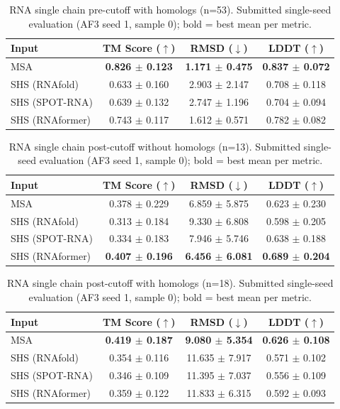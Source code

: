\begin{table}[htbp]
\centering
\caption{RNA single chain pre-cutoff with homologs (n=53). Submitted single-seed evaluation (AF3 seed 1, sample 0); bold = best mean per metric.}
\label{tab:rna_single_chain_pre_cutoff_with_homologs}
\begin{tabular}{lccc}
\toprule
Input & TM Score ($\uparrow$) & RMSD ($\downarrow$) & LDDT ($\uparrow$) \\
\midrule
MSA & \textbf{0.826 $\pm$ 0.123} & \textbf{1.171 $\pm$ 0.475} & \textbf{0.837 $\pm$ 0.072} \\
SHS (RNAfold) & 0.633 $\pm$ 0.160 & 2.903 $\pm$ 2.147 & 0.708 $\pm$ 0.118 \\
SHS (SPOT-RNA) & 0.639 $\pm$ 0.132 & 2.747 $\pm$ 1.196 & 0.704 $\pm$ 0.094 \\
SHS (RNAformer) & 0.743 $\pm$ 0.117 & 1.612 $\pm$ 0.571 & 0.782 $\pm$ 0.082 \\
\bottomrule
\end{tabular}
\end{table}

\begin{table}[htbp]
\centering
\caption{RNA single chain post-cutoff without homologs (n=13). Submitted single-seed evaluation (AF3 seed 1, sample 0); bold = best mean per metric.}
\label{tab:rna_single_chain_post_cutoff_without_homologs}
\begin{tabular}{lccc}
\toprule
Input & TM Score ($\uparrow$) & RMSD ($\downarrow$) & LDDT ($\uparrow$) \\
\midrule
MSA & 0.378 $\pm$ 0.229 & 6.859 $\pm$ 5.875 & 0.623 $\pm$ 0.230 \\
SHS (RNAfold) & 0.313 $\pm$ 0.184 & 9.330 $\pm$ 6.808 & 0.598 $\pm$ 0.205 \\
SHS (SPOT-RNA) & 0.334 $\pm$ 0.183 & 7.946 $\pm$ 5.746 & 0.638 $\pm$ 0.188 \\
SHS (RNAformer) & \textbf{0.407 $\pm$ 0.196} & \textbf{6.456 $\pm$ 6.081} & \textbf{0.689 $\pm$ 0.204} \\
\bottomrule
\end{tabular}
\end{table}

\begin{table}[htbp]
\centering
\caption{RNA single chain post-cutoff with homologs (n=18). Submitted single-seed evaluation (AF3 seed 1, sample 0); bold = best mean per metric.}
\label{tab:rna_single_chain_post_cutoff_with_homologs}
\begin{tabular}{lccc}
\toprule
Input & TM Score ($\uparrow$) & RMSD ($\downarrow$) & LDDT ($\uparrow$) \\
\midrule
MSA & \textbf{0.419 $\pm$ 0.187} & \textbf{9.080 $\pm$ 5.354} & \textbf{0.626 $\pm$ 0.108} \\
SHS (RNAfold) & 0.354 $\pm$ 0.116 & 11.635 $\pm$ 7.917 & 0.571 $\pm$ 0.102 \\
SHS (SPOT-RNA) & 0.346 $\pm$ 0.109 & 11.395 $\pm$ 7.037 & 0.556 $\pm$ 0.109 \\
SHS (RNAformer) & 0.359 $\pm$ 0.122 & 11.833 $\pm$ 6.315 & 0.592 $\pm$ 0.093 \\
\bottomrule
\end{tabular}
\end{table}

